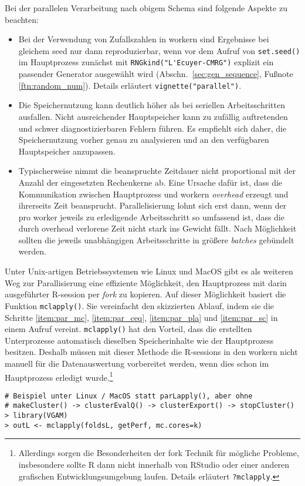 Bei der parallelen Verarbeitung nach obigem Schema sind folgende Aspekte zu beachten:
\begin{itemize}
\item Bei der Verwendung von Zufallszahlen in workern sind Ergebnisse bei gleichem seed nur dann reproduzierbar, wenn vor dem Aufruf von \lstinline!set.seed()! im Hauptprozess zunächst mit \lstinline!RNGkind("L'Ecuyer-CMRG")! explizit ein passender Generator ausgewählt wird (Abschn.\ \ref{sec:gen_sequence}, Fußnote \ref{ftn:random_num}). Details erläutert \lstinline!vignette("parallel")!.
\item Die Speichernutzung kann deutlich höher als bei seriellen Arbeitsschritten ausfallen. Nicht ausreichender Hauptspeicher kann zu zufällig auftretenden und schwer diagnostizierbaren Fehlern führen. Es empfiehlt sich daher, die Speichernutzung vorher genau zu analysieren und an den verfügbaren Hauptspeicher anzupassen.
\item Typischerweise nimmt die beanspruchte Zeitdauer nicht proportional mit der Anzahl der eingesetzten Rechenkerne ab. Eine Ursache dafür ist, dass die Kommunikation zwischen Hauptprozess und workern \emph{overhead} erzeugt und ihrerseits Zeit beansprucht. Parallelisierung lohnt sich erst dann, wenn der pro worker jeweils zu erledigende Arbeitsschritt so umfassend ist, dass die durch overhead verlorene Zeit nicht stark ins Gewicht fällt. Nach Möglichkeit sollten die jeweils unabhängigen Arbeitsschritte in größere \emph{batches} gebündelt werden.
\end{itemize}

Unter Unix-artigen Betriebssystemen wie Linux und MacOS gibt es als weiteren Weg zur Parallisierung eine effiziente Möglichkeit, den Hauptprozess mit darin ausgeführter R-session per \emph{fork} zu kopieren. Auf dieser Möglichkeit basiert die Funktion \lstinline!mclapply()!. Sie vereinfacht den skizzierten Ablauf, indem sie die Schritte \ref{item:par_mc}, \ref{item:par_ceq}, \ref{item:par_pla} und \ref{item:par_sc} in einem Aufruf vereint. \lstinline!mclapply()! hat den Vorteil, dass die erstellten Unterprozesse automatisch dieselben Speicherinhalte wie der Hauptprozess besitzen. Deshalb müssen mit dieser Methode die R-sessions in den workern nicht manuell für die Datenauswertung vorbereitet werden, wenn dies schon im Hauptprozess erledigt wurde.\footnote{Allerdings sorgen die Besonderheiten der fork Technik für mögliche Probleme, insbesondere sollte R dann nicht innerhalb von RStudio oder einer anderen grafischen Entwicklungsumgebung laufen. Details erläutert \lstinline!?mclapply!.}
\begin{lstlisting}
# Beispiel unter Linux / MacOS statt parLapply(), aber ohne
# makeCluster() -> clusterEvalQ() -> clusterExport() -> stopCluster()
> library(VGAM)
> outL <- mclapply(foldsL, getPerf, mc.cores=k)
\end{lstlisting}

